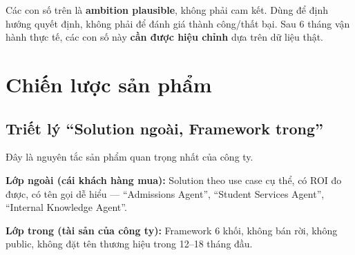 \documentclass[11pt,a4paper]{article}
\begin{document}
\begin{warnbox}[title=Cảnh báo]
Các con số trên là \textbf{ambition plausible}, không phải cam kết. Dùng để định
hướng quyết định, không phải để đánh giá thành công/thất bại. Sau 6 tháng
vận hành thực tế, các con số này \textbf{cần được hiệu chỉnh} dựa trên dữ liệu thật.
\end{warnbox}

\clearpage

\section{Chiến lược sản phẩm}

\subsection{Triết lý ``Solution ngoài, Framework trong''}

Đây là nguyên tắc sản phẩm quan trọng nhất của công ty.

\textbf{Lớp ngoài (cái khách hàng mua):} Solution theo use case cụ thể, có ROI
đo được, có tên gọi dễ hiểu — ``Admissions Agent'', ``Student Services Agent'',
``Internal Knowledge Agent''.

\textbf{Lớp trong (tài sản của công ty):} Framework 6 khối, không bán rời, không
public, không đặt tên thương hiệu trong 12--18 tháng đầu.
\end{document}
